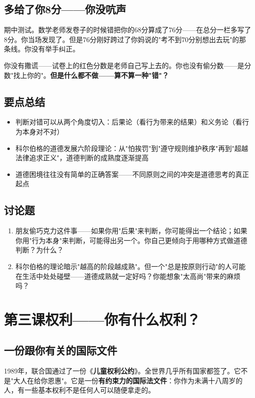 \documentclass[a4paper,12pt]{ctexart}
\begin{document}
\subsection*{多给了你8分——你没吭声}

期中测试。数学老师发卷子的时候错把你的68分算成了76分——在总分一栏多写了8分。你当场发现了。但是76分刚好跨过了你妈说的"考不到70分别想出去玩"的那条线。你没有举手纠正。

你没有撒谎——试卷上的红色分数是老师自己写上去的。你也没有偷分数——是分数"找上你的"。\textbf{但是什么都不做——算不算一种"错"？}

\subsection*{要点总结}
\begin{itemize}
  \item 判断对错可以从两个角度切入：后果论（看行为带来的结果）和义务论（看行为本身对不对）
  \item 科尔伯格的道德发展六阶段理论：从"怕挨罚"到"遵守规则维护秩序"再到"超越法律追求正义"，道德判断的成熟度逐渐提高
  \item 道德困境往往没有简单的正确答案——不同原则之间的冲突是道德思考的真正起点
\end{itemize}

\subsection*{讨论题}
\begin{enumerate}
  \item 朋友偷巧克力这件事——如果你用"后果"来判断，你可能得出一个结论；如果你用"行为本身"来判断，可能得出另一个。你自己更倾向于用哪种方式做道德判断？为什么？
  \item 科尔伯格的理论暗示"越高的阶段越成熟"。但一个"总是按原则行动"的人可能在生活中处处碰壁——道德成熟就一定好吗？你能想象"太高尚"带来的麻烦吗？
\end{enumerate}

\newpage
\section{\textcolor{orange!80!black}{第三课\quad 权利——你有什么权利？}}

\subsection*{一份跟你有关的国际文件}

1989年，联合国通过了一份《\textbf{儿童权利公约}》。全世界几乎所有国家都签了。它不是"大人在给你恩惠"。它是一份\textbf{有约束力的国际法文件}：你作为未满十八周岁的人，有一些基本权利不是任何人可以随便拿走的。
\end{document}
